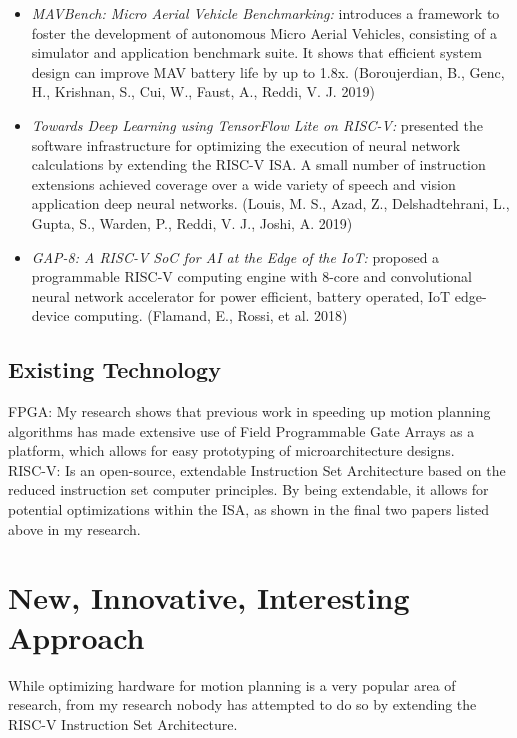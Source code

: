 \documentclass[11pt, oneside]{article}   	%
\begin{document}
\begin{itemize}
    \item \textit{MAVBench: Micro Aerial Vehicle Benchmarking:} introduces a framework to foster the development of autonomous Micro Aerial Vehicles, consisting of a simulator and application benchmark suite. It shows that efficient system design can improve MAV battery life by up to 1.8x. (Boroujerdian, B., Genc, H., Krishnan, S., Cui, W., Faust, A., Reddi, V. J. 2019)


    \item \textit{Towards Deep Learning using TensorFlow Lite on RISC-V:} presented the software infrastructure for optimizing the execution of neural network calculations by extending the RISC-V ISA. A small number of instruction extensions achieved coverage over a wide variety of speech and vision application deep neural networks. (Louis, M. S., Azad, Z., Delshadtehrani, L., Gupta, S., Warden, P., Reddi, V. J., Joshi, A. 2019)


    \item \textit{GAP-8: A RISC-V SoC for AI at the Edge of the IoT:} proposed a programmable RISC-V computing engine with 8-core and convolutional neural network accelerator for power efficient, battery operated, IoT edge-device computing. (Flamand, E., Rossi, et al. 2018)

\end{itemize}

\subsection{Existing Technology}

FPGA: My research shows that previous work in speeding up motion planning algorithms has made extensive use of Field Programmable Gate Arrays as a platform, which allows for easy prototyping of microarchitecture designs.\\

RISC-V: Is an open-source, extendable Instruction Set Architecture based on the reduced instruction set computer principles. By being extendable, it allows for potential optimizations within the ISA, as shown in the final two papers listed above in my research.

\clearpage

\section{New, Innovative, Interesting Approach}

While optimizing hardware for motion planning is a very popular area of research, from my research nobody has attempted to do so by extending the RISC-V Instruction Set Architecture.
\end{document}
